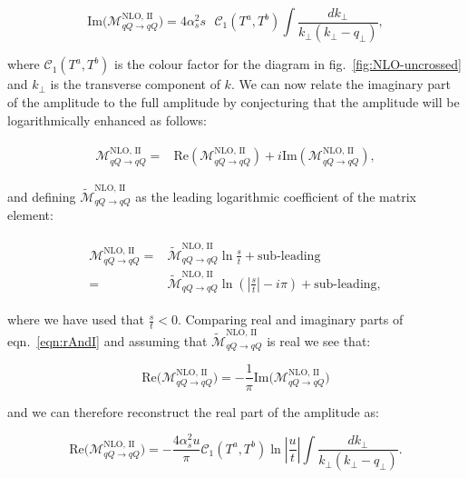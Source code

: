 	\begin{equation}
		\text{Im}\Big(\mathcal{M}_{qQ\rightarrow qQ}^{\text{NLO, II}}\Big) =
		4\alpha_s^2 s\text{ }\mathcal{C}_1(T^a,T^b)
		\int \frac{dk_{\perp}}{k_{\perp}(k_{\perp} - q_{\perp})},
	\end{equation}

	where $\mathcal{C}_1(T^a,T^b)$ is the colour factor for the diagram in fig.~\eqref{fig:NLO-uncrossed}
	and $k_{\perp}$ is the transverse component of $k$.  We can now relate the
	imaginary part of the amplitude to the full amplitude by conjecturing that the amplitude will be
	logarithmically enhanced as follows:

	\begin{align}
	\begin{split}
		\mathcal{M}_{qQ\rightarrow qQ}^{\text{NLO, II}} =
		&\text{Re}(\mathcal{M}_{qQ\rightarrow qQ}^{\text{NLO, II}}) +
		i\text{Im}(\mathcal{M}_{qQ\rightarrow qQ}^{\text{NLO, II}}),
	\end{split}
	\end{align}

	and defining $\widetilde{\mathcal{M}}_{qQ\rightarrow qQ}^{\text{NLO, II}}$ as the leading
	logarithmic coefficient of the matrix element:

	\begin{align}
	\begin{split}
		\mathcal{M}_{qQ\rightarrow qQ}^{\text{NLO, II}} =&\widetilde{\mathcal{M}}_{qQ\rightarrow qQ}^{\text{NLO, II}}\ln\frac{s}{t} + \text{sub-leading}\\
		=&\widetilde{\mathcal{M}}_{qQ\rightarrow qQ}^{\text{NLO, II}}
		\ln\left(\left|\frac{s}{t}\right| -i\pi\right)+ \text{sub-leading},
		\label{eqn:rAndI}
	\end{split}
	\end{align}

	where we have used that $\frac{s}{t} < 0$.  Comparing real and imaginary parts of eqn.~\eqref{eqn:rAndI}
	and assuming that $\widetilde{\mathcal{M}}_{qQ\rightarrow qQ}^{\text{NLO, II}}$ is real we see that:

	\begin{equation}
		\text{Re}\Big(\mathcal{M}_{qQ\rightarrow qQ}^{\text{NLO, II}}\Big) =
		-\frac{1}{\pi}\text{Im}\Big(\mathcal{M}_{qQ\rightarrow qQ}^{\text{NLO, II}}\Big)
	\end{equation}

	and we can therefore reconstruct the real part of the amplitude as:

	\begin{equation}
		\text{Re}\Big(\mathcal{M}_{qQ\rightarrow qQ}^{\text{NLO, II}}\Big) =
		-\frac{4\alpha_s^2u}{\pi} \mathcal{C}_1(T^a,T^b)
		\ln\left|\frac{u}{t}\right|\int \frac{dk_{\perp}}{k_{\perp}(k_{\perp} - q_{\perp})}.
		\label{eqn:uncrossedNLOcontrib}
	\end{equation}

